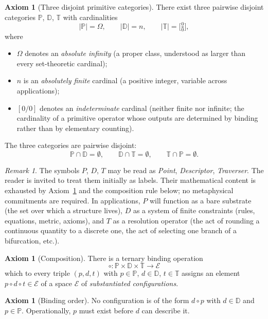 \documentclass[11pt,a4paper]{article}
\theoremstyle{definition}
\newtheorem{axiom}[theorem]{Axiom}
\theoremstyle{remark}
\newtheorem{remark}[theorem]{Remark}
\newcommand{\PP}{\mathbb{P}}
\newcommand{\DD}{\mathbb{D}}
\newcommand{\TT}{\mathbb{T}}
\begin{document}
\begin{axiom}[Three disjoint primitive categories]\label{ax:categories}
There exist three pairwise disjoint categories $\PP$, $\DD$, $\TT$ with cardinalities
\[
|\PP| = \Omega, \qquad |\DD| = n, \qquad |\TT| = \bigl[\tfrac{0}{0}\bigr],
\]
where
\begin{itemize}[leftmargin=*]
\item $\Omega$ denotes an \emph{absolute infinity} (a proper class, understood as larger than every set-theoretic cardinal);
\item $n$ is an \emph{absolutely finite} cardinal (a positive integer, variable across applications);
\item $[0/0]$ denotes an \emph{indeterminate} cardinal (neither finite nor infinite; the cardinality of a primitive operator whose outputs are determined by binding rather than by elementary counting).
\end{itemize}
The three categories are pairwise disjoint:
\[
\PP\cap\DD = \emptyset, \qquad \DD\cap\TT = \emptyset, \qquad \TT\cap\PP = \emptyset.
\]
\end{axiom}

\begin{remark}
The symbols $P$, $D$, $T$ may be read as \emph{Point}, \emph{Descriptor}, \emph{Traverser}. The reader is invited to treat them initially as labels. Their mathematical content is exhausted by Axiom~\ref{ax:categories} and the composition rule below; no metaphysical commitments are required. In applications, $P$ will function as a bare substrate (the set over which a structure lives), $D$ as a system of finite constraints (rules, equations, metric, axioms), and $T$ as a resolution operator (the act of rounding a continuous quantity to a discrete one, the act of selecting one branch of a bifurcation, etc.).
\end{remark}

\begin{axiom}[Composition]\label{ax:compose}
There is a ternary binding operation
\[
\circ\colon \PP\times\DD\times\TT \longrightarrow \mathcal{E}
\]
which to every triple $(p,d,t)$ with $p\in\PP$, $d\in\DD$, $t\in\TT$ assigns an element $p\circ d\circ t\in\mathcal{E}$ of a space $\mathcal{E}$ of \emph{substantiated configurations}.
\end{axiom}

\begin{axiom}[Binding order]\label{ax:order}
No configuration is of the form $d\circ p$ with $d\in\DD$ and $p\in\PP$. Operationally, $p$ must exist before $d$ can describe it.
\end{axiom}
\end{document}
